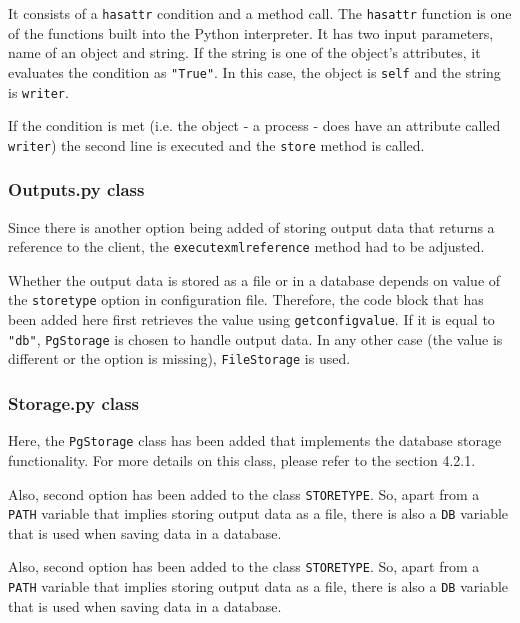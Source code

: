 It consists of a \texttt{hasattr} condition and a method call. The \texttt{hasattr} function is one of the functions built into the Python interpreter. It has two input parameters, name of an object and string. If the string is one of the object's attributes, it evaluates the condition as \texttt{"True"}. \cite{hasattr} In this case, the object is \texttt{self} and the string is \texttt{writer}. 

If the condition is met (i.e. the object - a process - does have an attribute called \texttt{writer}) the second line is executed and the \texttt{store} method is called.

\subsubsection{Outputs.py class}

Since there is another option being added of storing output data that returns a reference to the client, the \texttt{\textunderscore execute\textunderscore xml\textunderscore reference} method had to be adjusted.

Whether the output data is stored as a file or in a database depends on value of the \texttt{store\textunderscore type} option in configuration file. Therefore, the code block that has been added here first retrieves the value using \texttt{get\textunderscore config\textunderscore value}. If it is equal to \texttt{"db"}, \texttt{PgStorage} is chosen to handle output data. In any other case (the value is different or the option is missing), \texttt{FileStorage} is used.

\subsubsection{Storage.py class}

Here, the \texttt{PgStorage} class has been added that implements the database storage functionality. For more details on this class, please refer to the section 4.2.1.

Also, second option has been added to the class \texttt{STORE\textunderscore TYPE}.  So, apart from a \texttt{PATH} variable that implies storing output data as a file, there is also a \texttt{DB} variable that is used when saving data in a database.

Also, second option has been added to the class \texttt{STORE\textunderscore TYPE}. So, apart from a \texttt{PATH} variable that implies storing output data as a file, there is also a \texttt{DB} variable that is used when saving data in a database.

